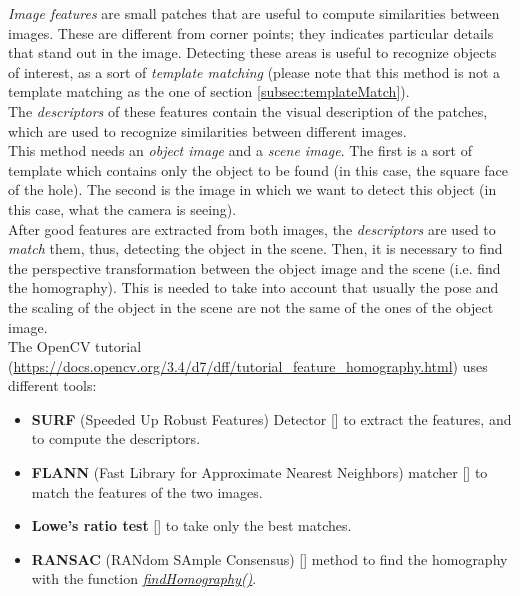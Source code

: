 \textit{Image features} are small patches that are useful to compute similarities between images. These are different from corner points; they indicates particular details that stand out in the image. Detecting these areas is useful to recognize objects of interest, as a sort of \textit{template matching} (please note that this method is not a template matching as the one of section \ref{subsec:templateMatch}).\\
The \textit{descriptors} of these features contain the visual description of the patches, which are used to recognize similarities between different images.\\

This method needs an \textit{object image} and a \textit{scene image}. The first is a sort of template which contains only the object to be found (in this case, the square face of the hole). The second is the image in which we want to detect this object (in this case, what the camera is seeing).\\
After good features are extracted from both images, the \textit{descriptors} are used to \textit{match} them, thus, detecting the object in the scene.
Then, it is necessary to find the perspective transformation between the object image and the scene (i.e. find the homography). This is needed to take into account that usually the pose and the scaling of the object in the scene are not the same of the ones of the object image.\\
The OpenCV tutorial (\url{https://docs.opencv.org/3.4/d7/dff/tutorial_feature_homography.html}) uses different tools:
\begin{itemize}
	\item \textbf{SURF} (Speeded Up Robust Features) Detector [\cite{surfDet}] to extract the features, and to compute the descriptors.
	\item \textbf{FLANN} (Fast Library for Approximate Nearest Neighbors) matcher [\cite{flannMatch}] to match the features of the two images.
	\item \textbf{Lowe's ratio test} [\cite{loweTest}] to take only the best matches.
	\item \textbf{RANSAC} (RANdom SAmple Consensus) [\cite{ransacHomog}] method to find the homography with the function \href{https://docs.opencv.org/3.4/d9/d0c/group__calib3d.html#ga4abc2ece9fab9398f2e560d53c8c9780}{\textit{findHomography()}}.
\end{itemize}


